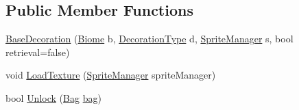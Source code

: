 \subsection*{Public Member Functions}
\begin{DoxyCompactItemize}
\item 
\mbox{\hyperlink{class_base_decoration_a75dae0a3df64d463e98ba2bdeed02265}{Base\+Decoration}} (\mbox{\hyperlink{class_biome}{Biome}} b, \mbox{\hyperlink{class_base_decoration_a8adb8095439bd24fd3c2058b2ecbbf11}{Decoration\+Type}} d, \mbox{\hyperlink{class_sprite_manager}{Sprite\+Manager}} s, bool retrieval=false)
\item 
void \mbox{\hyperlink{class_base_decoration_aafdc27ba3ede4f9eadc66e8dd6fa9b1a}{Load\+Texture}} (\mbox{\hyperlink{class_sprite_manager}{Sprite\+Manager}} sprite\+Manager)
\item 
bool \mbox{\hyperlink{class_base_decoration_a820de02d0bb917f7cee59a4759da6251}{Unlock}} (\mbox{\hyperlink{class_bag}{Bag}} \mbox{\hyperlink{class_base_decoration_ac89ba4289b6d0b80d564aeb969615a3f}{bag}})
\end{DoxyCompactItemize}
